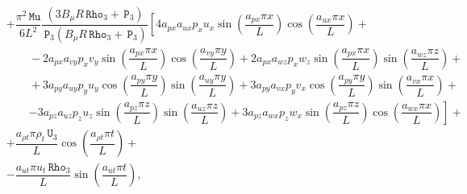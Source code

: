 \documentclass[10pt]{article}
\newcommand{\Rho}{\,\mathtt{Rho}}
\newcommand{\PP}{\,\mathtt{P}}
\newcommand{\U}{\,\mathtt{U}}
\newcommand{\MU}{\,\mathtt{Mu}}
\begin{document}
\begin{equation}
\begin{split}
%
&+  \dfrac{ \pi^2 \MU}{6L^2}\dfrac{(3 B_\mu R \Rho_3+\PP_3)}{\PP_3  (B_\mu R \Rho_3+\PP_3) }\left[4 a_{px} a_{ux} p_x u_x \sin\left(\dfrac{a_{px} \pi x}{L}\right) \cos\left(\dfrac{a_{ux} \pi x}{L}\right)\right.+\\
    &\qquad-2 a_{px} a_{vy} p_x v_y \sin\left(\dfrac{a_{px} \pi x}{L}\right) \cos\left(\dfrac{a_{vy} \pi y}{L}\right)+2 a_{px} a_{wz} p_x w_z \sin\left(\dfrac{a_{px} \pi x}{L}\right) \sin\left(\dfrac{a_{wz} \pi z}{L}\right)+\\
    &\qquad+3 a_{py} a_{uy} p_y u_y \cos\left(\dfrac{a_{py} \pi y}{L}\right) \sin\left(\dfrac{a_{uy} \pi y}{L}\right)+3 a_{py} a_{vx} p_y v_x \cos\left(\dfrac{a_{py} \pi y}{L}\right) \sin\left(\dfrac{a_{vx} \pi x}{L}\right)+\\
    &\qquad\left.-3 a_{pz}a_{uz}  p_z u_z \sin\left(\dfrac{a_{pz} \pi z}{L}\right) \sin\left(\dfrac{a_{uz} \pi z}{L}\right)+3 a_{pz}  a_{wx} p_z w_x \sin\left(\dfrac{a_{pz} \pi z}{L}\right) \cos\left(\dfrac{a_{wx} \pi x}{L}\right)\right]+\\
&+ \dfrac{ a_{\rho t} \pi \rho_t \U_3}{L}\cos\left(\dfrac{a_{\rho t} \pi t}{L}\right)+\\
&-\dfrac{a_{ut} \pi u_t  \Rho_3 }{L}\sin\left(\dfrac{a_{ut} \pi t}{L}\right)
,
 \end{split}
\end{equation}
\end{document}
